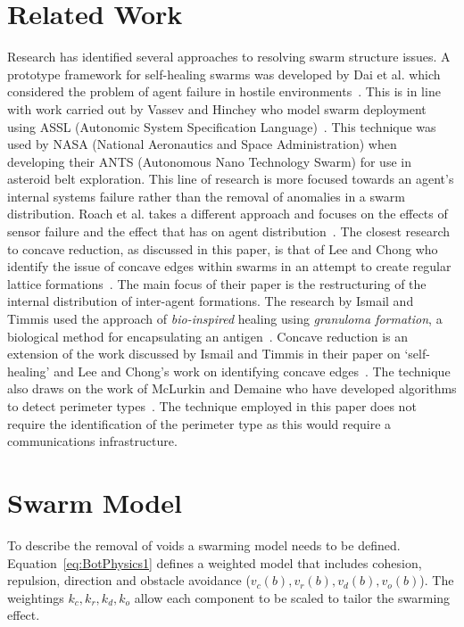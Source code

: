 \documentclass{ieeeaccess}
\begin{document}
\section{Related Work}\label{sec:RelatedWork}
Research has identified several approaches to resolving swarm structure issues. A prototype framework for self-healing swarms was developed by Dai et al. which considered the problem of agent failure in hostile environments~\cite{DHMRZ:06}. This is in line with work carried out by Vassev and Hinchey who model swarm deployment using ASSL (Autonomic System Specification Language)~\cite{VH:09}. This technique was used by NASA (National Aeronautics and Space Administration) when developing their ANTS (Autonomous Nano Technology Swarm) for use in asteroid belt exploration. This line of research is more focused towards an agent's internal systems failure rather than the removal of anomalies in a swarm distribution. Roach et al. takes a different approach and focuses on the effects of sensor failure and the effect that has on agent distribution~\cite{RMT:15}. The closest research to concave reduction, as discussed in this paper, is that of Lee and Chong who identify the issue of concave edges within swarms in an attempt to create regular lattice formations~\cite{GN:08}. The main focus of their paper is the restructuring of the internal distribution of inter-agent formations. The research by Ismail and Timmis used the approach of \textit{bio-inspired} healing using \textit{granuloma formation}, a biological method for encapsulating an antigen~\cite{IT:10}.
Concave reduction is an extension of the work discussed by Ismail and Timmis in their paper on `self-healing' \cite{IT:10} and Lee and Chong's work on identifying concave edges~\cite{GN:08}. The technique also draws on the work of McLurkin and Demaine who have developed algorithms to detect perimeter types~\cite{MD:09}. The technique employed in this paper does not require the identification of the perimeter type as this would require a communications infrastructure.

\section{Swarm Model}\label{sec:Swarm Model}
To describe the removal of voids a swarming model needs to be defined. Equation~\ref{eq:BotPhysics1} defines a weighted model that includes cohesion, repulsion, direction and obstacle avoidance ($v_c(b), v_r(b), v_d(b), v_o(b)$). The weightings $k_c, k_r, k_d, k_o$ allow each component to be scaled to tailor the swarming effect. 
\end{document}
